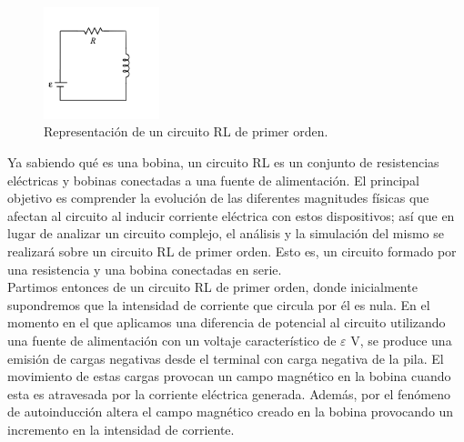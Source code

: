 \documentclass[../main.tex]{subfiles}
\begin{document}
\begin{figure}[!h]
    \centering
    \includegraphics[width=0.3\textwidth]{images/Circuito_RL.png}
    \caption{Representación de un circuito RL de primer orden.}
    \label{fig::circuito_rL_representación}
\end{figure}


Ya sabiendo qué es una bobina, un circuito RL es un conjunto de resistencias eléctricas y bobinas conectadas a una fuente de alimentación. El principal objetivo es comprender la evolución de las diferentes magnitudes físicas que afectan al circuito al inducir corriente eléctrica con estos dispositivos; así que en lugar de analizar un circuito complejo, el análisis y la simulación del mismo se realizará sobre un circuito RL de primer orden. Esto es, un circuito formado por una resistencia y una bobina conectadas en serie. \\

Partimos entonces de un circuito RL de primer orden, donde inicialmente supondremos que la intensidad de corriente que circula por él es nula. En el momento en el que aplicamos una diferencia de potencial al circuito utilizando una fuente de alimentación con un voltaje característico de $\varepsilon$ V, se produce una emisión de cargas negativas desde el terminal con carga negativa de la pila. El movimiento de estas cargas provocan un campo magnético en la bobina cuando esta es atravesada por la corriente eléctrica generada. Además, por el fenómeno de autoinducción altera el campo magnético creado en la bobina provocando un incremento en la intensidad de corriente.  
\end{document}
